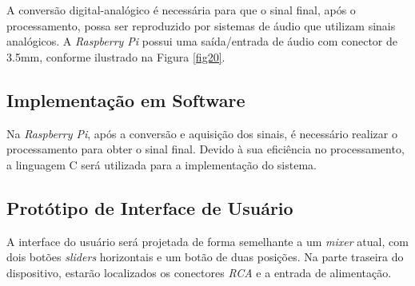 A conversão digital-analógico é necessária para que o sinal final, após o processamento, possa ser reproduzido por sistemas de áudio que utilizam sinais analógicos. A \textit{Raspberry Pi} possui uma saída/entrada de áudio com conector de 3.5mm, conforme ilustrado na Figura \ref{fig20}.

\subsection{Implementação em Software}

Na \textit{Raspberry Pi}, após a conversão e aquisição dos sinais, é necessário realizar o processamento para obter o sinal final. Devido à sua eficiência no processamento, a linguagem C será utilizada para a implementação do sistema.

\subsection{Protótipo de Interface de Usuário}

A interface do usuário será projetada de forma semelhante a um \textit{mixer} atual, com dois botões \textit{sliders} horizontais e um botão de duas posições. Na parte traseira do dispositivo, estarão localizados os conectores \textit{RCA} e a entrada de alimentação.
